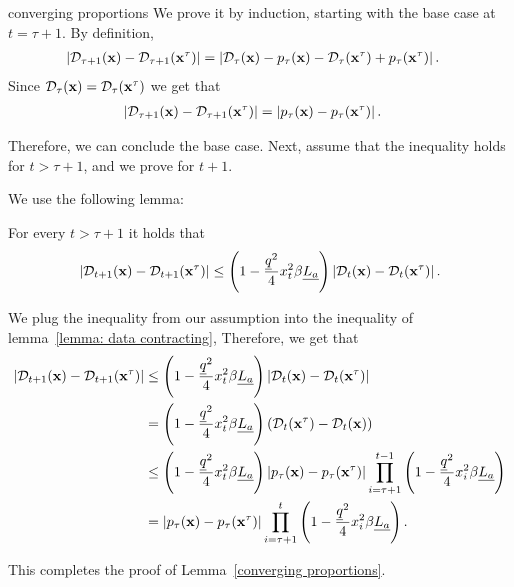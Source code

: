 \begin{proofof}{converging proportions}
We prove it by induction, starting with the base case at $t = \tau + 1$. By definition,
\begin{align*}
\left| \mathcal{D}_{\tau + 1}({\bf{x}}) - \mathcal{D}_{\tau + 1}({\bf{x}}^\tau) \right| &= \left| \mathcal{D}_{\tau}({\bf{x}}) - p_\tau ({\bf{x}}) - \mathcal{D}_{\tau}({\bf{x}}^\tau) + p_\tau ({\bf{x}}^\tau) \right|.
\end{align*}
Since $\mathcal{D}_{\tau}({\bf{x}}) = \mathcal{D}_{\tau}({\bf{x}}^\tau)$ we get that
\begin{align*}
\left| \mathcal{D}_{\tau + 1}({\bf{x}}) - \mathcal{D}_{\tau + 1}({\bf{x}}^\tau) \right| &= \left| p_\tau ({\bf{x}}) -  p_\tau ({\bf{x}}^\tau) \right|.
\end{align*}

Therefore, we can conclude the base case. Next, assume that the inequality holds for $t > \tau + 1$, and we prove for $t + 1$.

We use the following lemma:
\begin{lemma} \label{lemma: data contracting}
For every $t > \tau + 1$ it holds that
\begin{align*}
\left| \mathcal{D}_{t+1}({\bf{x}}) - \mathcal{D}_{t+1}({\bf{x}}^\tau) \right| \leq \left(1 - \frac{\underline{q} ^2}{4} x_t^2 \beta \underline{L_a} \right) \left| \mathcal{D}_{t}({\bf{x}}) - \mathcal{D}_{t}({\bf{x}}^\tau) \right|.
\end{align*}
\end{lemma}

We plug the inequality from our assumption into the inequality of lemma~\ref{lemma: data contracting}, Therefore, we get that
\begin{align*}
\left| \mathcal{D}_{t+1}({\bf{x}}) - \mathcal{D}_{t+1}({\bf{x}}^\tau) \right| &\leq \left(1 - \frac{\underline{q} ^2}{4} x_t^2 \beta \underline{L_a} \right) \left| \mathcal{D}_{t}({\bf{x}}) - \mathcal{D}_{t}({\bf{x}}^\tau) \right| \\
&= \left(1 - \frac{\underline{q} ^2}{4} x_t^2 \beta \underline{L_a} \right) \left( \mathcal{D}_{t}({\bf{x}}^\tau) - \mathcal{D}_{t}({\bf{x}}) \right) \\
&\leq \left(1 - \frac{\underline{q} ^2}{4} x_t^2 \beta \underline{L_a} \right) \left| p_\tau({\bf{x}}) - p_\tau({\bf{x}}^\tau) \right| \prod_{i = \tau + 1}^{t-1} \left( 1 - \frac{\underline{q} ^2}{4} x_i^2 \beta \underline{L_a} \right) \\
&= \left| p_\tau({\bf{x}}) - p_\tau({\bf{x}}^\tau) \right| \prod_{i = \tau + 1}^{t} \left( 1 - \frac{\underline{q} ^2}{4} x_i^2 \beta \underline{L_a} \right).
\end{align*}

This completes the proof of Lemma~\ref{converging proportions}.
\end{proofof}


